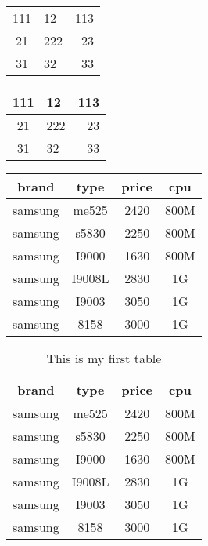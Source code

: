 \documentclass{book} %
\begin{document}
\begin{tabular}{clr}    %
  111 & 12 & 113 \\
  21 & 222 & 23 \\          %
  31 & 32 & 33  \\
\end{tabular}


\begin{tabular}{|c|l|r|}    %
  \hline    %
  111 & 12 & 113 \\         %
  \hline
  21 & 222 & 23 \\          %
  \hline
  31 & 32 & 33 \\
  \hline
\end{tabular}

\eject  %

\begin{tabular}{|cccc|}    
  \hline
brand & type & price & cpu\\
  \hline
samsung & me525 & 2420 & 800M\\
samsung & s5830 & 2250 & 800M\\
samsung & I9000 & 1630 & 800M\\
samsung & I9008L & 2830 & 1G\\
samsung & I9003 & 3050 & 1G\\
samsung & 8158 & 3000 & 1G\\
  \hline
\end{tabular}

\eject  %

\begin{table}
  \centering    %
  \begin{tabular}{|c|c|c|c|}
  \hline
brand & type & price & cpu\\
  \hline
samsung & me525 & 2420 & 800M\\
samsung & s5830 & 2250 & 800M\\
samsung & I9000 & 1630 & 800M\\
samsung & I9008L & 2830 & 1G\\
samsung & I9003 & 3050 & 1G\\
samsung & 8158 & 3000 & 1G\\
  \hline
\end{tabular}
  \caption{This is my first table}  %
\end{table}
\end{document}

